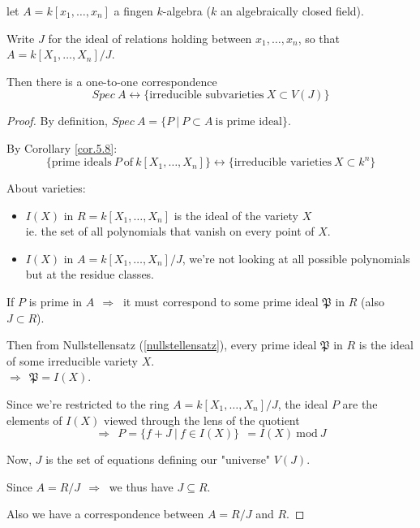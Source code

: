 \documentclass{article}
\theoremstyle{definition}
\newenvironment{prop}[1]
{\renewcommand\theinnerprop{#1}\innerprop}
{\endinnerprop}
\begin{document}
\begin{prop}{5.8} \label{5.8}
  let $A= k[x_1, \ldots, x_n]$ a fingen $k$-algebra ($k$ an algebraically closed field).

  Write $J$ for the ideal of relations holding between $x_1, \ldots, x_n$, so that $A=k[X_1, \ldots, X_n]/J$.

  Then there is a one-to-one correspondence
  $$Spec~ A \longleftrightarrow \{ \text{irreducible subvarieties}~ X \subset V(J) \}$$
\end{prop}
\begin{proof}
  By definition, $Spec~ A = \{ P ~|~ P \subset A ~\text{is prime ideal} \}$.

  By Corollary \ref{cor.5.8}:
    $$\{ \text{prime ideals}~P~\text{of}~k[X_1, \ldots, X_n] \} \longleftrightarrow \{ \text{irreducible varieties}~ X \subset k^n \}$$

  About varieties:
  \begin{itemize}
    \item $I(X)$ in $R=k[X_1, \ldots, X_n]$ is the ideal of the variety $X$\\
      \hspace*{2em}ie. the set of all polynomials that vanish on every point of $X$.
    \item $I(X)$ in $A=k[X_1, \ldots, X_n]/J$, we're not looking at all possible polynomials but at the residue classes.
  \end{itemize}

  If $P$ is prime in $A~~\Longrightarrow~$ it must correspond to some prime ideal $\mathfrak{P}$ in $R$ (also $J \subset R$).

  Then from Nullstellensatz (\ref{nullstellensatz}), every prime ideal $\mathfrak{P}$ in $R$ is the ideal of some irreducible variety $X$.\\
  \hspace*{2em}$\Longrightarrow~~ \mathfrak{P}=I(X)$.


  Since we're restricted to the ring $A=k[X_1, \ldots, X_n]/J$, the ideal $P$ are the elements of $I(X)$ viewed through the lens of the quotient\\
  $$\Longrightarrow~~ P = \{ f+J ~|~ f \in I(X) \}~~ = I(X) ~\text{mod}~J$$

  Now, $J$ is the set of equations defining our "universe" $V(J)$.

  Since $A=R/J ~~ \Longrightarrow~$ we thus have $J \subseteq R$.

  Also we have a correspondence between $A=R/J$ and $R$.


\end{proof}
\end{document}

